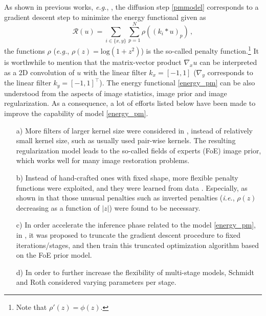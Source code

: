\documentclass[10pt,journal,compsoc]{IEEEtran}
\newcommand{\suml}[2]{\sum\limits_{#1}^{#2}}
\newcommand{\eg}{\emph{e.g.}}
\newcommand{\ie}{\emph{i.e.}}
\begin{document}
{As shown in previous works, \eg, \cite{relations, zhu1997prior}, 
the diffusion step \eqref{pmmodel} corresponds to a gradient descent 
step to minimize the energy functional given as 
\begin{equation}\label{energy_pm}
\mathcal{R}(u) = \suml{i \in \{x,y\}}{} \sum\limits_{p = 1}^{N} \rho((k_i * 
u)_p)\,,
\end{equation}
the functions $\rho$ (\eg, $\rho(z) = \text{log}(1+z^2)$) 
is the so-called penalty function.\footnote{Note that $\rho'(z) = \phi(z)$.}  
It is worthwhile to mention that 
the matrix-vector product $\nabla_x u$ can be interpreted as a
2D convolution of $u$ with the linear filter $k_x = [-1, 1]$
($\nabla_y$ corresponds to the linear filter $k_y = [-1, 1]^\top$). 
The energy functional \eqref{energy_pm} can be also understood from the aspects of 
image statistics, image prior and image regularization. 
As a consequence, a lot of efforts listed below 
have been made to improve the capability of model \eqref{energy_pm}.
\begin{itemize}[leftmargin=*]
\setlength\itemsep{0em}
\item[a)] \noindent 
More filters of larger kernel size were considered in \cite{zhu1997prior, 
RothFOE2009, ChenPRB13, Barbu2009}, instead of relatively 
small kernel size, such as usually used 
pair-wise kernels. The resulting regularization model 
leads to the so-called fields of experts (FoE) \cite{RothFOE2009} 
image prior, which works well 
for many image restoration problems. 
\item[b)] Instead of hand-crafted ones with fixed shape, 
more flexible penalty functions were exploited, and they were learned from 
data \cite{zhu1997prior, ScharrBH03, KrajsekS10, CSF2014}. Especially, 
as shown in \cite{zhu1997prior} that those 
unusual penalties such as inverted penalties 
(\ie, $\rho(z)$ decreasing as a function of $|z|$) 
were found to be necessary.
\item[c)] In order accelerate the inference phase related to the model 
\eqref{energy_pm}, in 
\cite{Barbu2009, DomkeAISTATS2012}, it was proposed to truncate the gradient 
descent procedure to fixed iterations/stages, 
and then train this truncated optimization 
algorithm based on the FoE prior model.
\item[d)] In order to further increase the flexibility of multi-stage models, 
Schmidt and Roth \cite{CSF2014} considered varying parameters per stage.
\end{itemize}
}
\end{document}
